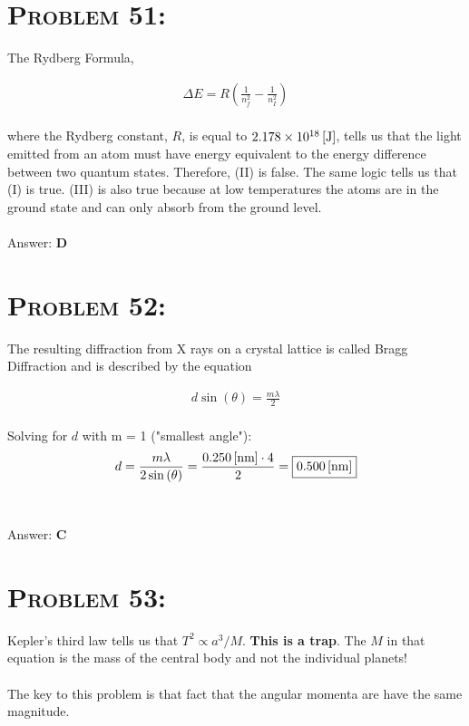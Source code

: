 \documentclass{article}
\providecommand{\e}[1]{\ensuremath{\times 10^{#1}}}
\begin{document}

\section{\textsc{Problem 51:}} The Rydberg Formula,

\begin{align}
\Delta E = R \left( \frac{1}{n_{f}^{2}} - \frac{1}{n_{I}^{2}}\right)
\end{align}
\\
where the Rydberg constant, $R$, is equal to $\unit[2.178\e{18}]{[J]}$, tells us that the light emitted from an atom must have energy equivalent to the energy difference between two quantum states. Therefore, (II) is false. The same logic tells us that (I) is true.  (III) is also true because at low temperatures the atoms are in the ground state and can only absorb from the ground level.
\\\\
Answer: \textbf{\textcolor{ProcessBlue}D}\\


\section{\textsc{Problem 52:}} The resulting diffraction from X rays on a crystal lattice is called Bragg Diffraction and is described by the equation

\begin{align}
d \sin{(\theta)} = \frac{m \lambda}{2}
\end{align}
\\
Solving for $d$ with m = 1 ("smallest angle"):
\begin{align}
d = \frac{m \lambda}{2 \sin{(\theta)}} = \frac{\unit[0.250]{[nm] \cdot 4}}{2} = \boxed{\unit[0.500]{[nm]}}\nonumber
\end{align}
\\\\
Answer: \textbf{\textcolor{ProcessBlue}C}\\


\section{\textsc{Problem 53:}} Kepler's third law tells us that $T^{2} \propto a^{3}/M$. \textbf{This is a trap}. The $M$ in that equation is the mass of the central body and not the individual planets!\\\\
The key to this problem is that fact that the angular momenta are have the same magnitude.
\end{document}
